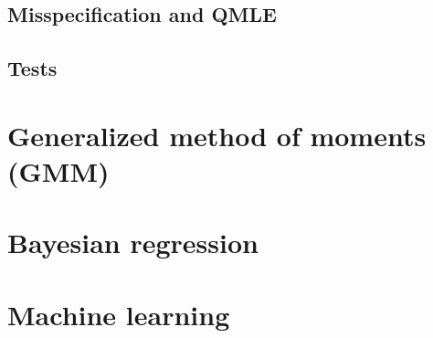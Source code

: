 \documentclass{article}
\begin{document}
\subsection{Misspecification and QMLE}
\subsection{Tests}



\section{Generalized method of moments (GMM)}
\section{Bayesian regression}
\section{Machine learning}
\end{document}
